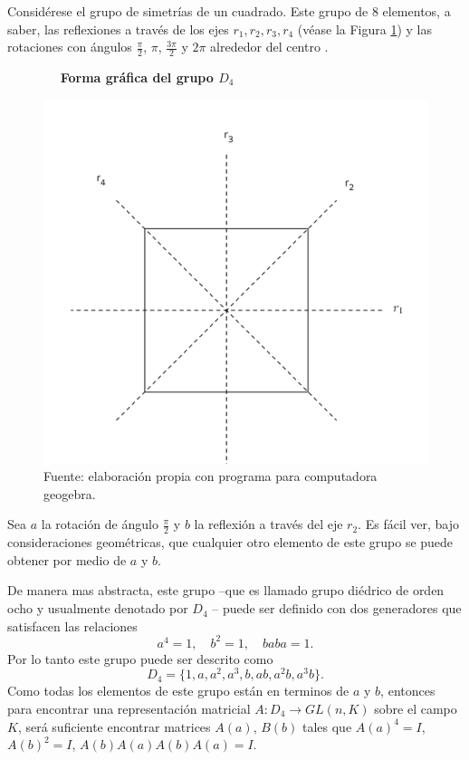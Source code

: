 \begin{ejemplo}[Representación de $D_4$]\label{ejem:diedrico}
Considérese el grupo de simetrías de un cuadrado. Este grupo de 8 elementos, a saber, las reflexiones a través de los ejes $r_1, r_2, r_3, r_4$ (véase la Figura \ref{fig:ejemplo}) y las rotaciones con ángulos $\frac{\pi}{2}$, $\pi$, $\frac{3\pi}{2}$ y $2\pi$ alrededor del centro . 



\begin{figure}[t]
  \centering
  \caption{$\quad $ \textbf{Forma gráfica del grupo $D_4$}}
  	  \includegraphics{cuadrado}
	  \captionsetup[figure]{textfont = normal, labelformat=empty, labelsep=period}
  	  \caption*{\newline Fuente: elaboración propia con programa para computadora geogebra.}
  \label{fig:ejemplo}
\end{figure}
Sea $a$ la rotación de ángulo $\frac{\pi}{2}$ y $b$ la reflexión a través del eje $r_2$. Es fácil ver, bajo consideraciones geométricas, que cualquier otro elemento de este grupo se puede obtener por medio de $a$ y $b$.

De manera mas abstracta, este grupo --que es llamado grupo diédrico de orden ocho y usualmente denotado por $D_4$ -- puede ser definido con dos generadores que satisfacen las relaciones
\begin{equation*}
a^4 = 1, \quad b^2 = 1 , \quad baba = 1.  
\end{equation*}
Por lo tanto este grupo puede ser descrito  como 
\begin{equation*}
D_4 = \{ 1, a, a^2, a^3, b, ab, a^2b, a^3b \}. 
\end{equation*}
Como todas los elementos de este grupo están en terminos de $a$ y $b$, entonces para encontrar una representación matricial $A \colon D_4 \to GL(n,K)$ sobre el campo $K$, será suficiente encontrar matrices $A(a)$, $B(b)$ tales que $A(a)^4 = I$, $A(b)^2 = I$, $A(b)A(a)A(b)A(a) = I.$


\end{ejemplo}
